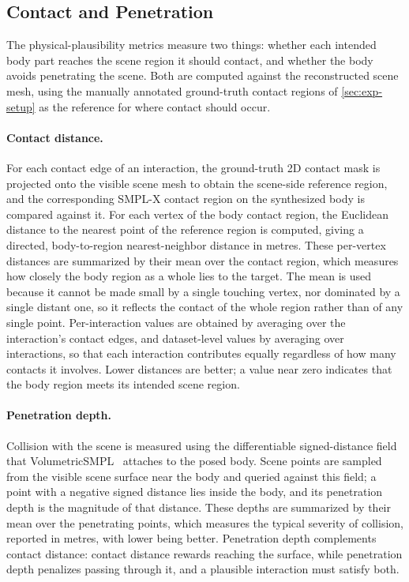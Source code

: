 \subsection{Contact and Penetration}
\label{sec:exp-metrics-physical}

The physical-plausibility metrics measure two things: whether each intended body part reaches the scene region it should contact, and whether the body avoids penetrating the scene. Both are computed against the reconstructed scene mesh, using the manually annotated ground-truth contact regions of \cref{sec:exp-setup} as the reference for where contact should occur.

\paragraph{Contact distance.} For each contact edge of an interaction, the ground-truth 2D contact mask is projected onto the visible scene mesh to obtain the scene-side reference region, and the corresponding SMPL-X contact region on the synthesized body is compared against it. For each vertex of the body contact region, the Euclidean distance to the nearest point of the reference region is computed, giving a directed, body-to-region nearest-neighbor distance in metres. These per-vertex distances are summarized by their mean over the contact region, which measures how closely the body region as a whole lies to the target. The mean is used because it cannot be made small by a single touching vertex, nor dominated by a single distant one, so it reflects the contact of the whole region rather than of any single point. Per-interaction values are obtained by averaging over the interaction's contact edges, and dataset-level values by averaging over interactions, so that each interaction contributes equally regardless of how many contacts it involves. Lower distances are better; a value near zero indicates that the body region meets its intended scene region.

\paragraph{Penetration depth.} Collision with the scene is measured using the differentiable signed-distance field that VolumetricSMPL~\cite{mihajlovic2025volumetricsmpl} attaches to the posed body. Scene points are sampled from the visible scene surface near the body and queried against this field; a point with a negative signed distance lies inside the body, and its penetration depth is the magnitude of that distance. These depths are summarized by their mean over the penetrating points, which measures the typical severity of collision, reported in metres, with lower being better. Penetration depth complements contact distance: contact distance rewards reaching the surface, while penetration depth penalizes passing through it, and a plausible interaction must satisfy both.

